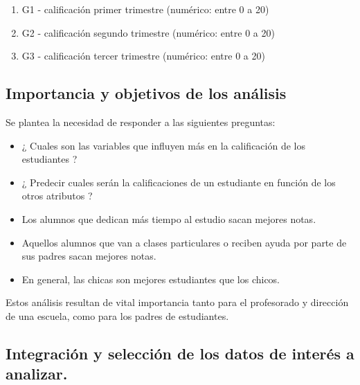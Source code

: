 \documentclass[]{article}
\providecommand{\tightlist}{%
  \setlength{\itemsep}{0pt}\setlength{\parskip}{0pt}}
\begin{document}
\begin{enumerate}
\def\labelenumi{\arabic{enumi}.}
\setcounter{enumi}{30}
\tightlist
\item
  G1 - calificación primer trimestre (numérico: entre 0 a 20)
\item
  G2 - calificación segundo trimestre (numérico: entre 0 a 20)
\item
  G3 - calificación tercer trimestre (numérico: entre 0 a 20)
\end{enumerate}

\hypertarget{importancia-y-objetivos-de-los-analisis}{%
\subsection{Importancia y objetivos de los
análisis}\label{importancia-y-objetivos-de-los-analisis}}

Se plantea la necesidad de responder a las siguientes preguntas:

\begin{itemize}
\item
  ¿ Cuales son las variables que influyen más en la calificación de los
  estudiantes ?
\item
  ¿ Predecir cuales serán la calificaciones de un estudiante en función
  de los otros atributos ?
\item
  Los alumnos que dedican más tiempo al estudio sacan mejores notas.
\item
  Aquellos alumnos que van a clases particulares o reciben ayuda por
  parte de sus padres sacan mejores notas.
\item
  En general, las chicas son mejores estudiantes que los chicos.
\end{itemize}

Estos análisis resultan de vital importancia tanto para el profesorado y
dirección de una escuela, como para los padres de estudiantes.

\hypertarget{integracion-y-seleccion-de-los-datos-de-interes-a-analizar.}{%
\subsection{Integración y selección de los datos de interés a
analizar.}\label{integracion-y-seleccion-de-los-datos-de-interes-a-analizar.}}
\end{document}
